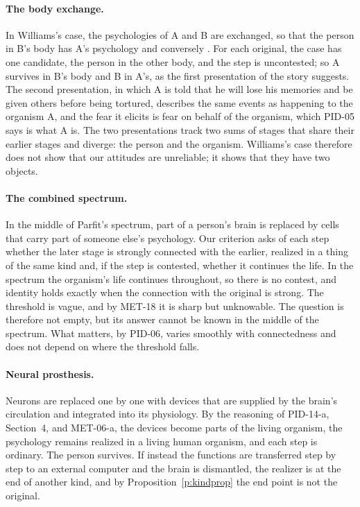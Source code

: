 \documentclass{situationist-preprint}
\begin{document}
\paragraph{The body exchange.} In Williams's case, the psychologies of A and B are exchanged, so that the person in B's body has A's psychology and conversely \citep{Williams1970}. For each original, the case has one candidate, the person in the other body, and the step is uncontested; so A survives in B's body and B in A's, as the first presentation of the story suggests. The second presentation, in which A is told that he will lose his memories and be given others before being tortured, describes the same events as happening to the organism A, and the fear it elicits is fear on behalf of the organism, which PID-05 says is what A is. The two presentations track two sums of stages that share their earlier stages and diverge: the person and the organism. Williams's case therefore does not show that our attitudes are unreliable; it shows that they have two objects.

\paragraph{The combined spectrum.} In the middle of Parfit's spectrum, part of a person's brain is replaced by cells that carry part of someone else's psychology. Our criterion asks of each step whether the later stage is strongly connected with the earlier, realized in a thing of the same kind and, if the step is contested, whether it continues the life. In the spectrum the organism's life continues throughout, so there is no contest, and identity holds exactly when the connection with the original is strong. The threshold is vague, and by MET-18 it is sharp but unknowable. The question is therefore not empty, but its answer cannot be known in the middle of the spectrum. What matters, by PID-06, varies smoothly with connectedness and does not depend on where the threshold falls.

\paragraph{Neural prosthesis.} Neurons are replaced one by one with devices that are supplied by the brain's circulation and integrated into its physiology. By the reasoning of PID-14-a, Section~4, and MET-06-a, the devices become parts of the living organism, the psychology remains realized in a living human organism, and each step is ordinary. The person survives. If instead the functions are transferred step by step to an external computer and the brain is dismantled, the realizer is at the end of another kind, and by Proposition~\ref{p:kindprop} the end point is not the original.
\end{document}
